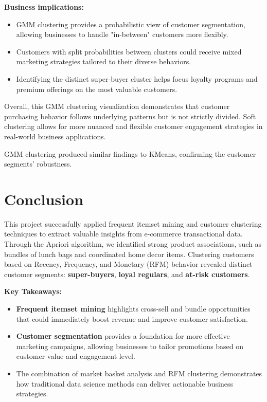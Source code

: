 \documentclass[12pt]{article}
\begin{document}
\vspace{0.4cm}

\textbf{Business implications:}
\begin{itemize}
    \item GMM clustering provides a probabilistic view of customer segmentation, allowing businesses to handle "in-between" customers more flexibly.
    \item Customers with split probabilities between clusters could receive mixed marketing strategies tailored to their diverse behaviors.
    \item Identifying the distinct super-buyer cluster helps focus loyalty programs and premium offerings on the most valuable customers.
\end{itemize}

\vspace{0.4cm}

Overall, this GMM clustering visualization demonstrates that customer purchasing behavior follows underlying patterns but is not strictly divided.  
Soft clustering allows for more nuanced and flexible customer engagement strategies in real-world business applications.

\vspace{0.4cm}


GMM clustering produced similar findings to KMeans, confirming the customer segments' robustness.

\section{Conclusion}

This project successfully applied frequent itemset mining and customer clustering techniques to extract valuable insights from e-commerce transactional data.  
Through the Apriori algorithm, we identified strong product associations, such as bundles of lunch bags and coordinated home decor items.  
Clustering customers based on Recency, Frequency, and Monetary (RFM) behavior revealed distinct customer segments: \textbf{super-buyers}, \textbf{loyal regulars}, and \textbf{at-risk customers}.

\vspace{0.4cm}

\textbf{Key Takeaways:}
\begin{itemize}
    \item \textbf{Frequent itemset mining} highlights cross-sell and bundle opportunities that could immediately boost revenue and improve customer satisfaction.
    \item \textbf{Customer segmentation} provides a foundation for more effective marketing campaigns, allowing businesses to tailor promotions based on customer value and engagement level.
    \item The combination of market basket analysis and RFM clustering demonstrates how traditional data science methods can deliver actionable business strategies.
\end{itemize}
\end{document}
